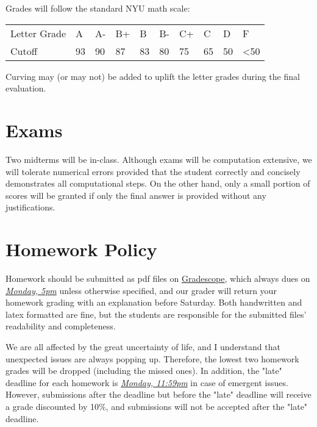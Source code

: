\documentclass[letterpaper]{inzane_syllabus} %
\begin{document}
Grades will follow the standard NYU math scale: 
\begin{center}
\begin{tabular}{ p{2.5cm} p{0.7cm} p{0.7cm} p{0.7cm} p{0.7cm} p{0.7cm} p{0.7cm} p{0.7cm} p{0.7cm} p{0.7cm}}
\hline
 Letter Grade        & A & A- & B+ & B & B- & C+ & C & D &F \\ 
 Cutoff              & 93 & 90 & 87 & 83 & 80 & 75 & 65 & 50 & <50  \\
 \hline 
\end{tabular}
\end{center}
Curving may (or may not) be added to uplift the letter grades during the final evaluation. 

\vspace{0.5cm}
\section{Exams}
Two midterms will be in-class. Although exams will be computation extensive, we will tolerate numerical errors provided that the student correctly and concisely demonstrates all computational steps. On the other hand, only a small portion of scores will be granted if only the final answer is provided without any justifications.

\newpage %

\makeSide %

\vspace{0.5cm}
\section{Homework Policy}
Homework should be submitted as pdf files on \href{https://www.gradescope.com/courses/360869}{Gradescope}, which always dues on \textit{\underline{Monday, 5pm}} unless otherwise specified, and our grader will return your homework grading with an explanation before Saturday. Both handwritten and latex formatted are fine, but the students are responsible for the submitted files' readability and completeness. 

We are all affected by the great uncertainty of life, and I understand that unexpected issues are always popping up. Therefore, the lowest two homework grades will be dropped (including the missed ones). In addition, the "late" deadline for each homework is \textit{\underline{Monday, 11:59pm}} in case of emergent issues. However, submissions after the deadline but before the "late" deadline will receive a grade discounted by 10\%, and submissions will not be accepted after the "late" deadline.  
\end{document}
